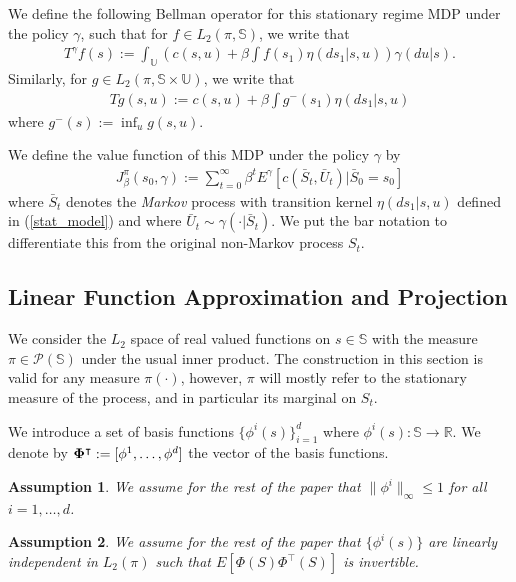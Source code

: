 \documentclass[11pt]{article}
\newtheorem{assumption}{Assumption}
\def\P{{\mathcal P}}
\begin{document}
We define the following Bellman operator for  this stationary regime MDP under the policy $\gamma$, such that for $f\in L_2(\pi,\mathds{S})$, we write that
\begin{align}\label{appr_bell}
T^\gamma f(s) := \int_\mathds{U}\left(c(s,u) + \beta \int f(s_1)\eta(ds_1|s,u)\right)\gamma(du|s).
\end{align}
Similarly, for $g\in L_2(\pi,\mathds{S\times U})$, we write that
\begin{align}\label{appr_bell2}
T g(s,u) := c(s,u) + \beta \int {g^-}(s_1)\eta(ds_1|s,u)
\end{align}
where ${g^-}(s):=\inf_u g(s,u)$.

We define the value function of this MDP under the policy $\gamma$ by 
\begin{align*}
J^\pi_\beta(s_0,\gamma):= \sum_{t=0}^\infty \beta^t E^\gamma [c(\bar{S}_t,\bar{U}_t)|\bar{S}_0=s_0]
\end{align*}
where $\bar{S}_t$ denotes the {\it Markov} process with transition kernel $\eta(ds_1|s,u)$ defined in (\ref{stat_model}) and where $\bar{U}_t\sim\gamma(\cdot|\bar{S}_t)$. We put the bar notation to differentiate this from the original non-Markov process $S_t$.


\subsection{Linear Function Approximation and Projection}\label{lin_app_proj}
We consider the $L_2$ space of real valued functions on $s\in \mathds{S}$ with the measure $\pi\in \P(\mathds{S})$ under the usual inner product. The construction in this section is valid for any measure $\pi(\cdot)$, however, $\pi$ will mostly refer to the stationary measure of the process, and in particular its marginal on $S_t$.  

We introduce a set of basis functions $\{\phi^i(s)\}_{i=1}^d$ where  $\phi^i(s):\mathds{S}\to \mathds{R}$.  We denote by ${\bf \Phi}^\intercal:= [\phi^1,\dots,\phi^d]$ the vector of the basis functions.
\begin{assumption}
We assume for the rest of the paper that $
\|\phi^i\|_\infty\leq 1$
for all $i=1,\dots,d$.
\end{assumption}

\begin{assumption}\label{lin_ind}
We assume  for the rest of the paper that $\{\phi^i(s)\}$ are linearly independent in $L_2(\pi)$ such that $E\left[\Phi(S)\Phi^\intercal(S)\right]$ is invertible. 
\end{assumption}
\end{document}

